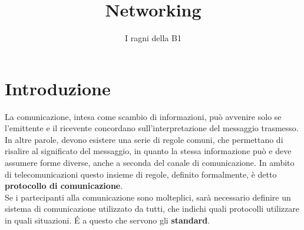 \documentclass[a4paper,11pt]{article}
\title{Networking}
\author{I ragni della B1}
\begin{document}
\maketitle
\newpage
\tableofcontents
\newpage

\section*{Introduzione}
La comunicazione, intesa come scambio di informazioni, può avvenire solo se l'emittente e il ricevente concordano sull'interpretazione del messaggio trasmesso. In altre parole, devono esistere una serie di regole comuni, che permettano di risalire al significato del messaggio, in quanto la stessa informazione può e deve assumere forme diverse, anche a seconda del canale di comunicazione.
In ambito di telecomunicazioni questo insieme di regole, definito formalmente, è detto \textbf{protocollo di comunicazione}. \\Se i partecipanti alla comunicazione sono molteplici, sarà necessario definire un sistema di comunicazione utilizzato da tutti, che indichi quali protocolli utilizzare in quali situazioni. \'E a questo che servono gli \textbf{standard}.
\end{document}
